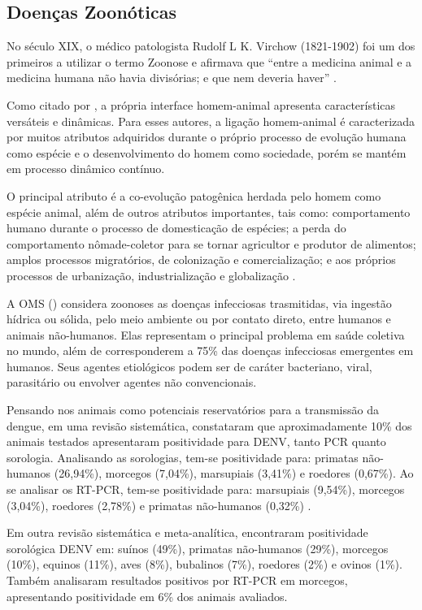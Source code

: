 \subsection{Doenças Zoonóticas}

\indent No século XIX, o médico patologista Rudolf L K. Virchow (1821-1902) foi um dos primeiros a utilizar o termo Zoonose e afirmava que “entre a medicina animal e a medicina humana não havia divisórias; e que nem deveria haver” \cite{CFMVSaude}.

\indent Como citado por , a própria interface homem-animal apresenta características versáteis e dinâmicas. Para esses autores, a ligação homem-animal é caracterizada por muitos atributos adquiridos durante o próprio processo de evolução humana como espécie e o desenvolvimento do homem como sociedade, porém se mantém em processo dinâmico contínuo.

\indent O principal atributo é a co-evolução patogênica herdada pelo homem como espécie animal, além de outros atributos importantes, tais como: comportamento humano durante o processo de domesticação de espécies; a perda do comportamento nômade-coletor para se tornar agricultor e produtor de alimentos; amplos processos migratórios, de colonização e comercialização;  e aos próprios processos de urbanização, industrialização e globalização \cite{HumanAnimalInterface}.

\indent A \acrshort{OMS} (\citeyear{WHO2020Zoonoses}) considera zoonoses as doenças infecciosas trasmitidas, via ingestão hídrica ou sólida, pelo meio ambiente ou por contato direto, entre humanos e animais não-humanos. Elas representam o principal problema em saúde coletiva no mundo, além de corresponderem a 75\% das doenças infecciosas emergentes em humanos. Seus agentes etiológicos podem ser de caráter bacteriano, viral, parasitário ou envolver agentes não convencionais.

\indent Pensando nos animais como potenciais reservatórios para a transmissão da dengue, em uma revisão sistemática, constataram que aproximadamente 10\% dos animais testados apresentaram positividade para \acrshort{DENV}, tanto PCR quanto sorologia. Analisando as sorologias, tem-se positividade para: primatas não-humanos (26,94\%), morcegos (7,04\%), marsupiais (3,41\%) e roedores (0,67\%). Ao se analisar os RT-PCR, tem-se positividade para:  marsupiais (9,54\%), morcegos (3,04\%), roedores (2,78\%) e primatas não-humanos (0,32\%)  \cite{Dengue_Animals_Gwee_2021}.

\indent Em outra revisão sistemática e meta-analítica,  encontraram positividade sorológica \acrshort{DENV} em: suínos (49\%), primatas não-humanos (29\%), morcegos (10\%), equinos (11\%), aves (8\%), bubalinos (7\%), roedores (2\%) e ovinos (1\%). Também analisaram resultados positivos por RT-PCR em morcegos, apresentando positividade em 6\% dos animais avaliados.

